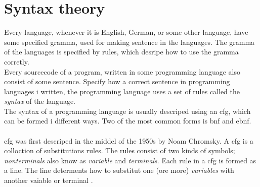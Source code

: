 \pagebreak
\section{Syntax theory}
Every language, whenever it is English, German, or some other language, have some specified gramma, used for making sentence in the languages. The gramma of the languages is specified by rules, which desripe how to use the gramma corretly. \\
Every sourcecode of a program, written in some programming language also consist of some sentence. Specify how a correct sentence in programming languages i written, the programming language uses a set of rules called the \textit{syntax} of the language. \\
The syntax of a programming language is usually descriped using an \ac{cfg}, which can be formed i different ways. Two of the most common forms is \ac{bnf} and \ac{ebnf}. \\
\\
\ac{cfg} was first descriped in the middel of the 1950s by Noam Chromsky. A \ac{cfg} is a colloction of substitutions rules. The rules consist of two kinds of symbols; \textit{nonterminals} also know as \textit{variable} and \textit{terminals}. Each rule in a \ac{cfg} is formed as a line. The line determents how to substitut one (ore more) \textit{variables} with another vaiable or terminal \cite{syntax_book}. \\

